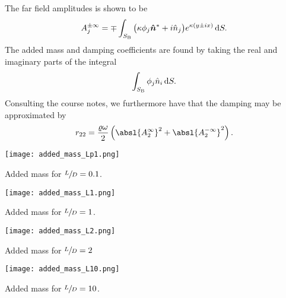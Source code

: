 The far field amplitudes is shown to be
\[
    A_j^{\pm \infty} = \mp \int_{S_{\mathrm{B}}} \big( \kappa \phi_j \bm{\hat{n}}^{\ast} + i\hat{n}_j \big) e^{\kappa(y \pm ix)} \,\mathrm{d} S.
\]
The added mass and damping coefficients are found by taking the real and imaginary parts of the integral
\[
    \int_{S_{\mathrm{B}}} \phi_j \hat{n}_i \,\mathrm{d} S.
\]
Consulting the course notes, we furthermore have that the damping may be approximated by
\[
    r_{22} = \frac{\varrho \omega}{2} \left( {\absl{A^{\infty}_{2}}}^2 + {\absl{A^{-\infty}_{2}}}^2 \right).
\]
\begin{Figure}
    \centering
    \captionsetup{type = figure}
    \texttt{[image: added\_mass\_Lp1.png]}
    \caption{Added mass for $\sfrac{L}{D} = 0.1$.}
\end{Figure}
\begin{Figure}
    \centering
    \captionsetup{type = figure}
    \texttt{[image: added\_mass\_L1.png]}
    \caption{Added mass for $\sfrac{L}{D} = 1$.}
\end{Figure}
\begin{Figure}
    \centering
    \captionsetup{type = figure}
    \texttt{[image: added\_mass\_L2.png]}
    \caption{Added mass for $\sfrac{L}{D} = 2$}
\end{Figure}
\begin{Figure}
    \centering
    \captionsetup{type = figure}
    \texttt{[image: added\_mass\_L10.png]}
    \caption{Added mass for $\sfrac{L}{D} = 10$.}
\end{Figure}